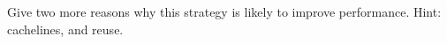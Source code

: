   Give two more reasons why this strategy is likely to improve
  performance. Hint: cachelines, and reuse.
